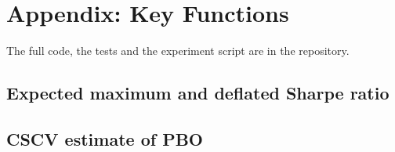 \documentclass[11pt,a4paper,oneside]{report}
\begin{document}
\chapter*{Appendix: Key Functions}
The full code, the tests and the experiment script are in the repository.

\section*{Expected maximum and deflated Sharpe ratio}


\section*{CSCV estimate of PBO}

\end{document}
